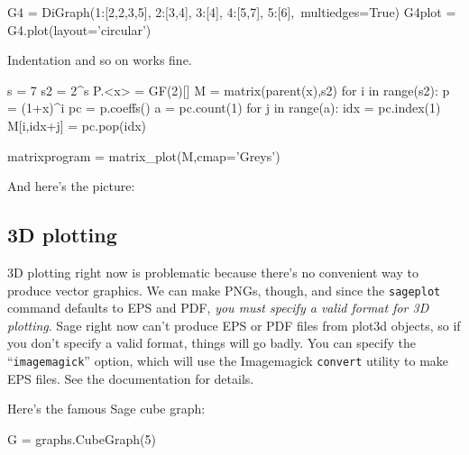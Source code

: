 \documentclass{article}
\begin{document}

\begin{sageblock}
G4 = DiGraph({1:[2,2,3,5], 2:[3,4], 3:[4], 4:[5,7], 5:[6]},\
             multiedges=True)
G4plot = G4.plot(layout='circular')
\end{sageblock}


Indentation and so on works fine.
\begin{sageblock}
 s     = 7
 s2    = 2^s
 P.<x> = GF(2)[]
 M     = matrix(parent(x),s2)
 for i in range(s2):
    p  = (1+x)^i
    pc = p.coeffs()
    a  = pc.count(1)
    for j in range(a):
        idx        = pc.index(1)
        M[i,idx+j] = pc.pop(idx)

 matrixprogram = matrix_plot(M,cmap='Greys')
\end{sageblock}
And here's the picture:


\subsection{3D plotting}

3D plotting right now is problematic because there's no convenient way
to produce vector graphics. We can make PNGs, though, and since the
\verb|sageplot| command defaults to EPS and PDF, \emph{you must specify
a valid format for 3D plotting}. Sage right now can't produce EPS or PDF
files from plot3d objects, so if you don't specify a valid format,
things will go badly. You can specify the ``\texttt{imagemagick}''
option, which will use the Imagemagick \texttt{convert} utility to make
EPS files. See the documentation for details.

Here's the famous Sage cube graph:

\begin{sageblock}
  G = graphs.CubeGraph(5)
\end{sageblock}

\end{document}

